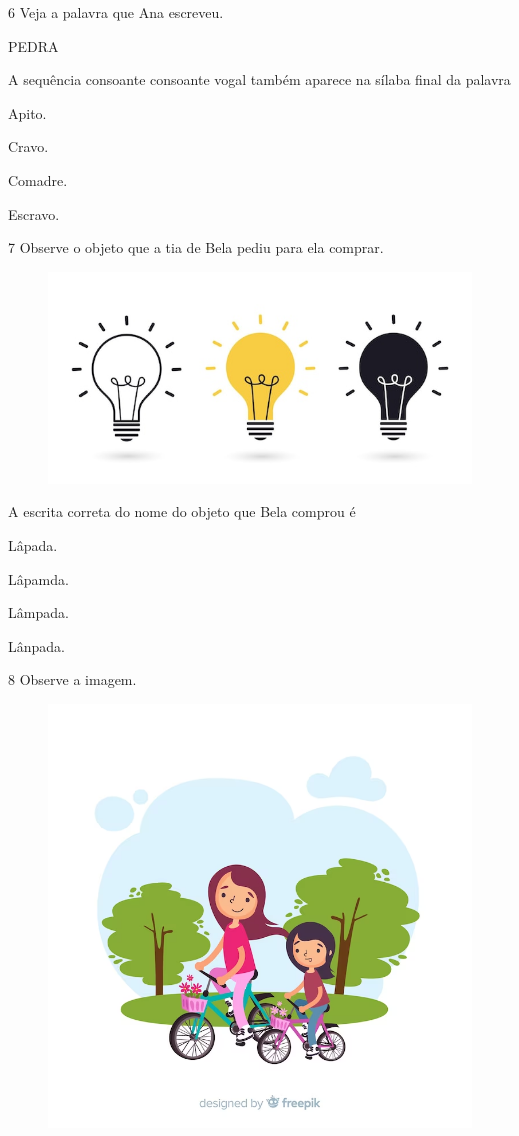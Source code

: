 \num{6} Veja a palavra que Ana escreveu.

\begin{myquote}
PEDRA
\end{myquote}

A sequência consoante consoante vogal também aparece na sílaba final da palavra

\begin{escolha}
\item Apito.

\item Cravo.

\item Comadre.

\item Escravo.
\end{escolha}

\num{7} Observe o objeto que a tia de Bela pediu para ela comprar.

\begin{figure}[htpb!]
\centering
\includegraphics[width=.5\textwidth]{media/image178.jpeg}
\end{figure}


A escrita correta do nome do objeto que Bela comprou é

\begin{escolha}
\item Lâpada.

\item Lâpamda.

\item Lâmpada.

\item Lânpada.
\end{escolha}

\num{8} Observe a imagem.

\begin{figure}[htpb!]
\centering
\includegraphics[width=.5\textwidth]{media/image179.png}
\end{figure}

